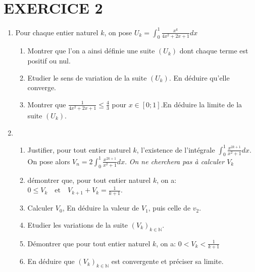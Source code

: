 \documentclass[13pts]{report}
\begin{document}
\section*{EXERCICE 2}
\begin{enumerate}
	\item Pour chaque entier naturel $k$, on pose $U_k=\int_{0}^{1}\frac{x^k}{4x^2+2x+1}dx$
		\begin{enumerate}
			\item Montrer que l'on a ainsi définie une suite $(U_k)$ dont chaque terme est positif ou nul.
			\item Etudier le sens de variation de la suite $(U_k)$. En déduire qu'elle converge.
			\item Montrer que $\frac{1}{4x^2+2x+1}\leq \frac{4}{3}$ pour $x\in [0;1]$.En déduire la limite de la suite $(U_k)$.
		\end{enumerate}
	\item \begin{enumerate}
				\item Justifier, pour tout entier naturel $k$, l'existence de l'intégrale $\int_{0}^{1}\frac{x^{2k+1}}{x^2+1}dx $. On pose alors $V_n=2\int_{0}^{1}\frac{x^{2k+1}}{x^2+1}dx $. \textit{On ne cherchera pas à calculer $V_k$}
				\item démontrer que, pour tout entier naturel $k$, on a: $0\leq V_k \quad \text{et}\quad V_{k+1}+V_k=\frac{1}{k+1}$.
				\item Calculer $V_0$, En déduire la valeur de $V_1$, puis celle de $v_2$.
				\item Etudier les variations de la suite $(V_k)_{k\in \mathbb{N}}$.
				\item Démontrer que pour tout entier naturel $k$, on a: $0 < V_k< \frac{1}{k+1}$
				\item En déduire que  $(V_k)_{k\in \mathbb{N}}$ est convergente et préciser sa limite.
		  \end{enumerate}
\end{enumerate}

\end{document}
